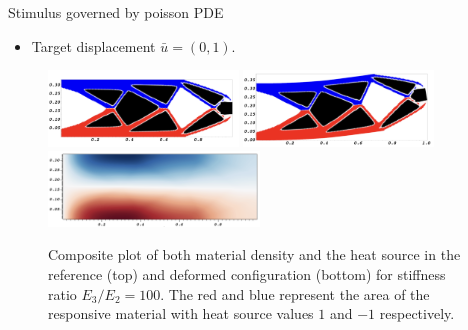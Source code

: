 \documentclass{beamer}
\begin{document}
\begin{frame}{Stimulus governed by poisson PDE}
    \begin{itemize}
        \item Target displacement $\bar{u}=(0,1).$
    \end{itemize}
    \begin{figure}[H]
        \centering
        \includegraphics[width=0.45\textwidth]{figures/BeamLoadRatio100DirLS-Composite.png}
        \includegraphics[width=0.45\textwidth]{figures/BeamLoadRatio100DirLS-disp.png}
        \includegraphics[width=0.5\textwidth]{figures/stimulus.png}
        \caption{Composite plot of both material density and the heat source in 
        the reference (top) and deformed configuration (bottom) for stiffness 
        ratio $E_3/E_2=100.$ The red and blue represent the area of the responsive 
        material with heat source values $1$ and $-1$ respectively.}
        \label{fig:designs-staticRatio10}
    \end{figure}
\end{frame}

\end{document}
